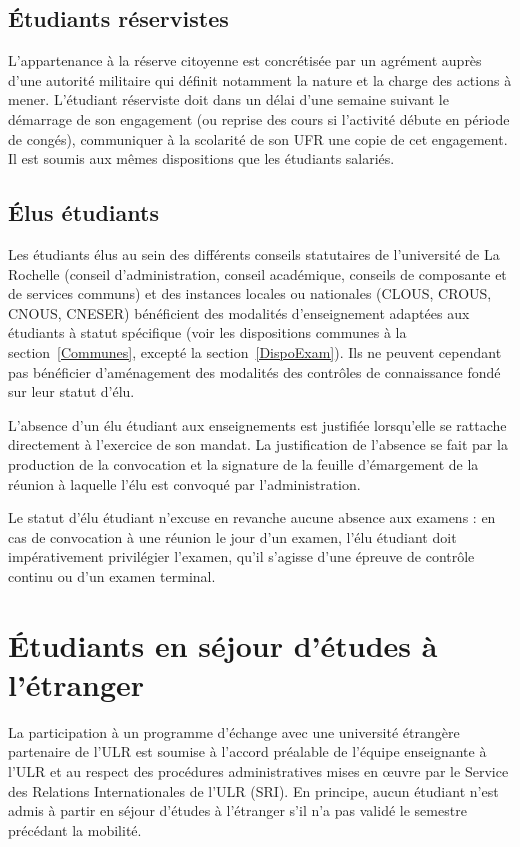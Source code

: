 \documentclass[a4paper,11pt]{article}
\begin{document}
\subsection{Étudiants réservistes}\label{Reserviste}
L'appartenance à la réserve citoyenne est concrétisée par un agrément auprès d'une autorité militaire qui définit notamment la nature et la charge des actions à mener.
L'étudiant réserviste doit dans un délai d'une semaine suivant le démarrage de son engagement (ou reprise des cours si l'activité débute en période de congés), communiquer à la scolarité de son UFR une copie de cet engagement. Il est soumis aux mêmes dispositions que les étudiants salariés.

\subsection{Élus étudiants}\label{Elu}
Les étudiants élus au sein des différents conseils statutaires de l'université de La Rochelle (conseil d'administration, conseil académique, conseils de composante et de services communs) et des instances locales ou nationales (CLOUS, CROUS, CNOUS, CNESER) bénéficient des modalités d'enseignement adaptées aux étudiants à statut spécifique (voir les dispositions communes à la section~\ref{Communes}, excepté la section~\ref{DispoExam}). Ils ne peuvent cependant pas bénéficier d'aménagement des modalités des contrôles de connaissance fondé sur leur statut d'élu.


L'absence d'un élu étudiant aux enseignements est justifiée lorsqu'elle se rattache directement à l'exercice de son mandat. La justification de l'absence se fait par la production de la convocation et la signature de la feuille d'émargement de la réunion à laquelle l'élu est convoqué par l'administration.

Le statut d'élu étudiant n'excuse en revanche aucune absence aux examens : en cas de convocation à une réunion le jour d'un examen, l'élu étudiant doit impérativement privilégier l'examen, qu'il s'agisse d'une épreuve de contrôle continu ou d'un examen terminal.

\section{Étudiants en séjour d'études à l'étranger}\label{Etranger}

La participation à un programme d'échange avec une université étrangère partenaire de l'ULR est soumise à l'accord préalable de l'équipe enseignante à l'ULR et au respect des procédures administratives mises en \oe uvre par le Service des Relations Internationales de l'ULR (SRI). En principe, aucun étudiant n'est admis à partir en séjour d'études à l'étranger s'il n'a pas validé le semestre précédant la mobilité.
\end{document}
